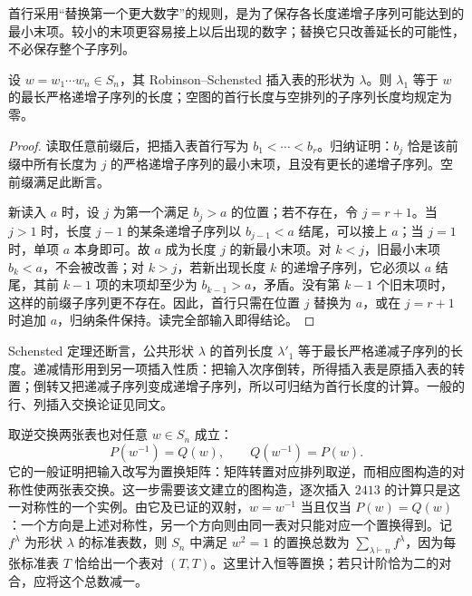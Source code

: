 首行采用“替换第一个更大数字”的规则，是为了保存各长度递增子序列可能达到的最小末项。较小的末项更容易接上以后出现的数字；替换它只改善延长的可能性，不必保存整个子序列。

\begin{proposition}\label{b5:prop:A-schensted-first-row}
	设 \(w=w_1\cdots w_n\in S_n\)，其 Robinson--Schensted 插入表的形状为 \(\lambda\)。则 \(\lambda_1\) 等于 \(w\) 的最长严格递增子序列的长度；空图的首行长度与空排列的子序列长度均规定为零。
\end{proposition}
\begin{proof}
	读取任意前缀后，把插入表首行写为 \(b_1<\cdots<b_r\)。归纳证明：\(b_j\) 恰是该前缀中所有长度为 \(j\) 的严格递增子序列的最小末项，且没有更长的递增子序列。空前缀满足此断言。

	新读入 \(a\) 时，设 \(j\) 为第一个满足 \(b_j>a\) 的位置；若不存在，令 \(j=r+1\)。当 \(j>1\) 时，长度 \(j-1\) 的某条递增子序列以 \(b_{j-1}<a\) 结尾，可以接上 \(a\)；当 \(j=1\) 时，单项 \(a\) 本身即可。故 \(a\) 成为长度 \(j\) 的新最小末项。对 \(k<j\)，旧最小末项 \(b_k<a\)，不会被改善；对 \(k>j\)，若新出现长度 \(k\) 的递增子序列，它必须以 \(a\) 结尾，其前 \(k-1\) 项的末项却至少为 \(b_{k-1}>a\)，矛盾。没有第 \(k-1\) 个旧末项时，这样的前缀子序列更不存在。因此，首行只需在位置 \(j\) 替换为 \(a\)，或在 \(j=r+1\) 时追加 \(a\)，归纳条件保持。读完全部输入即得结论。
\end{proof}

Schensted 定理还断言，公共形状 \(\lambda\) 的首列长度 \(\lambda'_1\) 等于最长严格递减子序列的长度\cite[Theorems 1--2, pp. 183, 188]{Schensted1961Subsequences}。递减情形用到另一项插入性质：把输入次序倒转，所得插入表是原插入表的转置；倒转又把递减子序列变成递增子序列，所以可归结为首行长度的计算。一般的行、列插入交换论证见同文\cite[Lemmas 6--7, pp. 183--188]{Schensted1961Subsequences}。

\ProseParagraphBreak
取逆交换两张表也对任意 \(w\in S_n\) 成立：
\[
	P(w^{-1})=Q(w),\qquad Q(w^{-1})=P(w).
\]
它的一般证明把输入改写为置换矩阵：矩阵转置对应排列取逆，而相应图构造的对称性使两张表交换\cite[Section 4, Theorem 3, p. 719]{Knuth1970Tableaux}。这一步需要该文建立的图构造，逐次插入 \(2413\) 的计算只是这一对称性的一个实例。由它及已证的双射，\(w=w^{-1}\) 当且仅当 \(P(w)=Q(w)\)：一个方向是上述对称性，另一个方向则由同一表对只能对应一个置换得到。记 \(f^\lambda\) 为形状 \(\lambda\) 的标准表数，则 \(S_n\) 中满足 \(w^2=1\) 的置换总数为 \(\sum_{\lambda\vdash n}f^\lambda\)，因为每张标准表 \(T\) 恰给出一个表对 \((T,T)\)。这里计入恒等置换；若只计阶恰为二的对合，应将这个总数减一。

